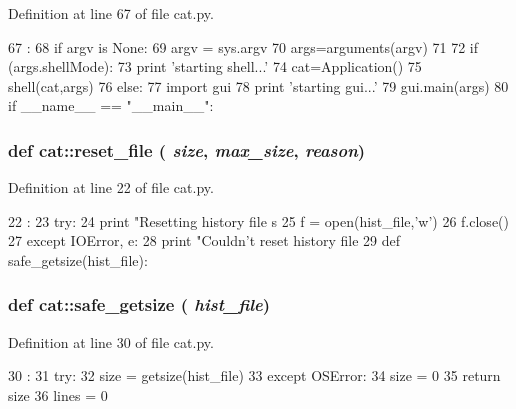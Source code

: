 Definition at line 67 of file cat.py.


\begin{DoxyCode}
67                    :
68   if argv is None:
69     argv = sys.argv
70     args=arguments(argv)
71 
72   if (args.shellMode):
73     print 'starting shell...'
74     cat=Application()
75     shell(cat,args)
76   else:
77     import gui
78     print 'starting gui...'
79     gui.main(args)
80 
if __name__ == "__main__":
\end{DoxyCode}
\hypertarget{namespacecat_a3278eaa551763fdc75174bf1765a1518}{
\subsubsection[{reset\_\-file}]{\setlength{\rightskip}{0pt plus 5cm}def cat::reset\_\-file ( {\em size}, \/   {\em max\_\-size}, \/   {\em reason})}}
\label{namespacecat_a3278eaa551763fdc75174bf1765a1518}


Definition at line 22 of file cat.py.


\begin{DoxyCode}
22                                     :
23         try:
24                 print "Resetting history file %
      s %
25                 f = open(hist_file,'w')
26                 f.close()
27         except IOError, e:
28                 print "Couldn't reset history file %
29 
def safe_getsize(hist_file):
\end{DoxyCode}
\hypertarget{namespacecat_ac6a71fb01aa157ac108135cd05a52f50}{
\subsubsection[{safe\_\-getsize}]{\setlength{\rightskip}{0pt plus 5cm}def cat::safe\_\-getsize ( {\em hist\_\-file})}}
\label{namespacecat_ac6a71fb01aa157ac108135cd05a52f50}


Definition at line 30 of file cat.py.


\begin{DoxyCode}
30                            :
31         try:
32                 size = getsize(hist_file)
33         except OSError:
34                 size = 0
35         return size
36 
lines = 0
\end{DoxyCode}


